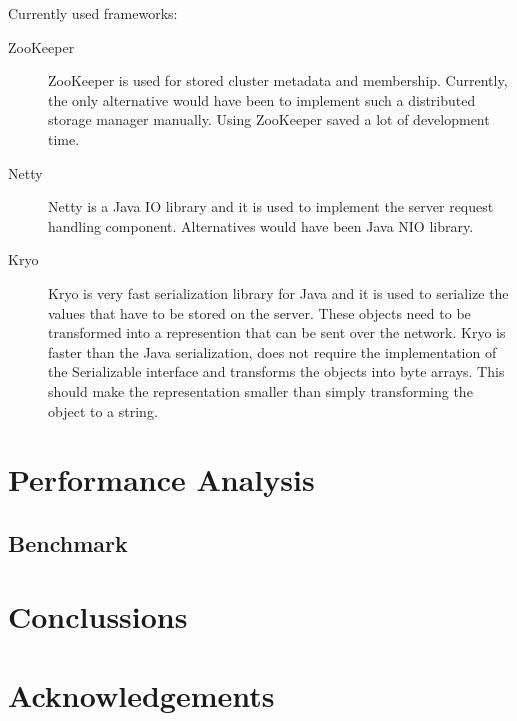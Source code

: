 \documentclass[11pt,a4paper]{globis-book}
\begin{document}
Currently used frameworks:
\begin{description}
    \item[ZooKeeper] ZooKeeper is used for stored cluster metadata and membership. Currently, the only alternative would have been to implement such a distributed storage manager manually. Using ZooKeeper saved a lot of development time. 
    \item[Netty] Netty is a Java IO library and it is used to implement the server request handling component. Alternatives would have been Java NIO library.
    \item[Kryo] Kryo is very fast serialization library for Java and it is used to serialize the values that have to be stored on the server. These objects need to be transformed into a represention that can be sent over the network. Kryo is faster than the Java serialization, does not require the implementation of the Serializable interface and transforms the objects into byte arrays. This should make the representation smaller than simply transforming the object to a string.
\end{description}
\chapter{Performance Analysis}
\section{Benchmark}

\chapter{Conclussions}

\appendix

\listoffigures
\listoftables

\chapter*{Acknowledgements}

\newpage
\thispagestyle{empty}



\end{document}
